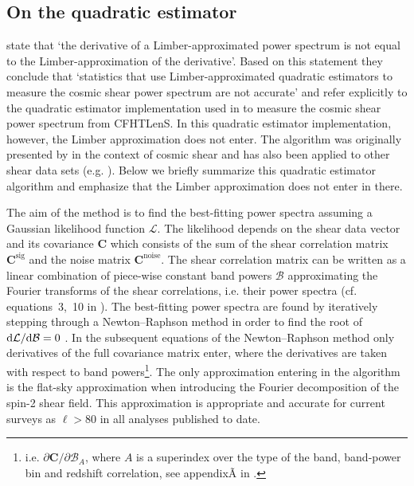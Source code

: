 \subsection{On the quadratic estimator}

\citet{kitching/etal:2016} state that `the derivative of a Limber-approximated power spectrum is not equal to the Limber-approximation of the derivative'. Based on this statement they conclude that `statistics that use Limber-approximated quadratic estimators to measure the cosmic shear power spectrum are not accurate' and refer explicitly to the quadratic estimator implementation used in \citet{Koehlinger2016} to measure the cosmic shear power spectrum from CFHTLenS. In this quadratic estimator implementation, however, the Limber approximation does not enter. The algorithm was originally presented by \citet{Hu2001} in the context of cosmic shear and has also been applied to other shear data sets (e.g. \citealt{Brown2003, Heymans2005, Lin2012}). Below we briefly summarize this quadratic estimator algorithm and emphasize that the Limber approximation does not enter in there.

The aim of the method is to find the best-fitting power spectra assuming a Gaussian likelihood function $\mathcal{L}$. The likelihood depends on the shear data vector and its covariance $\mathbf{C}$ which consists of the sum of the shear correlation matrix $\mathbf{C}^\mathrm{sig}$ and the noise matrix $\mathbf{C}^\mathrm{noise}$. The shear correlation matrix can be written as a linear combination of piece-wise constant band powers $\mathcal{B}$ approximating the Fourier transforms of the shear correlations, i.e. their power spectra (cf. equations~3,~10 in \citealt{Koehlinger2016}). The best-fitting power spectra are found by iteratively stepping through a Newton--Raphson method in order to find the root of $\mathrm{d} \mathcal{L}/ \mathrm{d} \mathcal{B} = 0$ \citep{Bond1998, Seljak1998}. In the subsequent equations of the Newton--Raphson method only derivatives of the full covariance matrix enter, where the derivatives are taken with respect to band powers\footnote{i.e. $\partial \mathbf{C} / \partial \mathcal{B}_A$, where $A$ is a superindex over the type of the band, band-power bin and redshift correlation, see appendix\~A in \citealt{Koehlinger2016}.}.  The only approximation entering in the algorithm is the flat-sky approximation when introducing the Fourier decomposition of the spin-2 shear field.    This approximation is appropriate and accurate for current surveys as $\ell>80$  in all analyses published to date.
